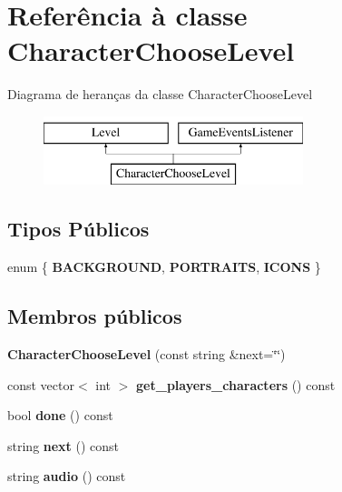 \hypertarget{classCharacterChooseLevel}{}\section{Referência à classe Character\+Choose\+Level}
\label{classCharacterChooseLevel}
Diagrama de heranças da classe Character\+Choose\+Level\begin{figure}[H]
\begin{center}
\leavevmode
\includegraphics[height=2.000000cm]{classCharacterChooseLevel}
\end{center}
\end{figure}
\subsection*{Tipos Públicos}
\begin{DoxyCompactItemize}
\item 
\mbox{\label{classCharacterChooseLevel_a88404336608984c1a3d735e6d5ebd5cf}} 
enum \{ {\bfseries B\+A\+C\+K\+G\+R\+O\+U\+ND}, 
{\bfseries P\+O\+R\+T\+R\+A\+I\+TS}, 
{\bfseries I\+C\+O\+NS}
 \}
\end{DoxyCompactItemize}
\subsection*{Membros públicos}
\begin{DoxyCompactItemize}
\item 
\mbox{\label{classCharacterChooseLevel_aa72c1238bc930fd230d13b89f75f5bb3}} 
{\bfseries Character\+Choose\+Level} (const string \&next=\char`\"{}\char`\"{})
\item 
\mbox{\label{classCharacterChooseLevel_a5746558bdd1785dd88ae2bf99a1ebc7d}} 
const vector$<$ int $>$ {\bfseries get\+\_\+players\+\_\+characters} () const
\item 
\mbox{\label{classCharacterChooseLevel_a61050bcd8df73c5a1c941e2d3af6d384}} 
bool {\bfseries done} () const
\item 
\mbox{\label{classCharacterChooseLevel_a5ec053a025429ee6c11ef2aa5ec26218}} 
string {\bfseries next} () const
\item 
\mbox{\label{classCharacterChooseLevel_ad46b1c34bad5001f45c0b386ad7fc8e1}} 
string {\bfseries audio} () const
\end{DoxyCompactItemize}
